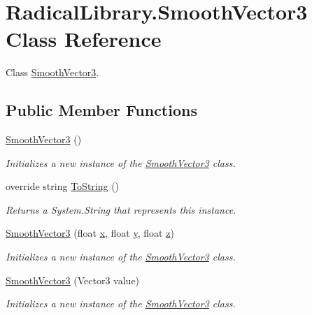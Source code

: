 \hypertarget{class_radical_library_1_1_smooth_vector3}{}\section{Radical\+Library.\+Smooth\+Vector3 Class Reference}
\label{class_radical_library_1_1_smooth_vector3}


Class \hyperlink{class_radical_library_1_1_smooth_vector3}{Smooth\+Vector3}.  


\subsection*{Public Member Functions}
\begin{DoxyCompactItemize}
\item 
\hyperlink{class_radical_library_1_1_smooth_vector3_aad45af5d380eab1fc102d5f77e2776d8}{Smooth\+Vector3} ()
\begin{DoxyCompactList}\small\item\em Initializes a new instance of the \hyperlink{class_radical_library_1_1_smooth_vector3}{Smooth\+Vector3} class. \end{DoxyCompactList}\item 
override string \hyperlink{class_radical_library_1_1_smooth_vector3_ad0c65a7f1c1ee33822d7be53a02beb23}{To\+String} ()
\begin{DoxyCompactList}\small\item\em Returns a System.\+String that represents this instance. \end{DoxyCompactList}\item 
\hyperlink{class_radical_library_1_1_smooth_vector3_a3873c455a7e39149ad1b54b1ca6b94f3}{Smooth\+Vector3} (float \hyperlink{class_radical_library_1_1_smooth_vector3_aabe4b65f544a412a094492a045056b74}{x}, float \hyperlink{class_radical_library_1_1_smooth_vector3_ac744758c88420820e1839ada11ae60ac}{y}, float \hyperlink{class_radical_library_1_1_smooth_vector3_accb3594d643d55a1edfde5c957602914}{z})
\begin{DoxyCompactList}\small\item\em Initializes a new instance of the \hyperlink{class_radical_library_1_1_smooth_vector3}{Smooth\+Vector3} class. \end{DoxyCompactList}\item 
\hyperlink{class_radical_library_1_1_smooth_vector3_ad98d9c92c28dbec533b3e6dfe95bc2f7}{Smooth\+Vector3} (Vector3 value)
\begin{DoxyCompactList}\small\item\em Initializes a new instance of the \hyperlink{class_radical_library_1_1_smooth_vector3}{Smooth\+Vector3} class. \end{DoxyCompactList}\end{DoxyCompactItemize}
